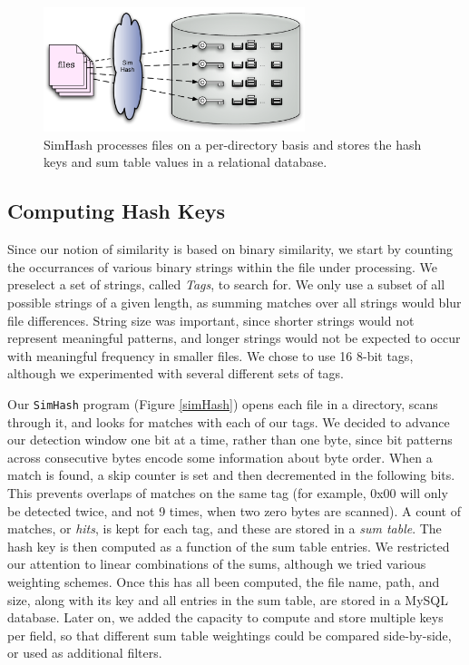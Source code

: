 \documentclass[10pt, twocolumn]{article}
\begin{document}
 \begin{figure}[h] 
 \centering
\includegraphics[width= 3in]{processFile.pdf}
\caption{SimHash processes files on a per-directory basis and stores the hash keys and sum table values in a relational database.}
\label{processingFiles} 
\end{figure}   

\subsection{Computing Hash Keys}

Since our notion of similarity is based on binary similarity, we start by counting the occurrances of various binary strings within the file under processing.  We preselect a set of strings, called {\it Tags}, to search for.  We only use a subset of all possible strings of a given length, as summing matches over all strings would blur file differences.  String size was important, since shorter strings would not represent meaningful patterns, and longer strings would not be expected to occur with meaningful frequency in smaller files.  We chose to use 16 8-bit tags, although we experimented with several different sets of tags.

Our {\tt SimHash} program (Figure \ref{simHash}) opens each file in a directory, scans through it, and looks for matches with each of our tags.  We decided to advance our detection window one bit at a time, rather than one byte, since bit patterns across consecutive bytes encode some information about byte order.  When a match is found, a skip counter is set and then decremented in the following bits.  This prevents overlaps of matches on the same tag (for example, 0x00 will only be detected twice, and not 9 times, when two zero bytes are scanned).  A count of matches, or {\it hits}, is kept for each tag, and these are stored in a {\it sum table}.  The hash key is then computed as a function of the sum table entries.  We restricted our attention to linear combinations of the sums, although we tried various weighting schemes.  Once this has all been computed, the file name, path, and size, along with its key and all entries in the sum table, are stored in  a MySQL database.  Later on, we added the capacity to compute and store multiple keys per field, so that different sum table weightings could be compared side-by-side, or used as additional filters.
\end{document}
